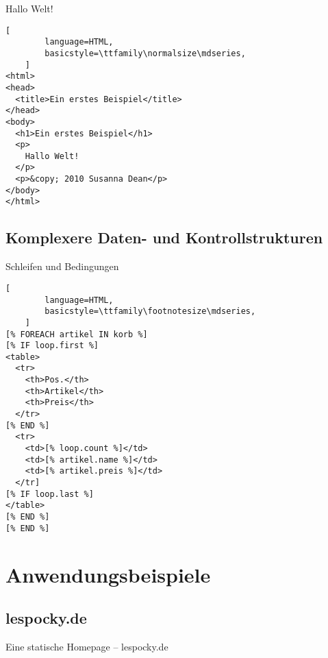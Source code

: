 \documentclass{beamer}
\begin{document}
\begin{frame}[fragile]{Hallo Welt!}
    \begin{lstlisting}[
        language=HTML,
        basicstyle=\ttfamily\normalsize\mdseries,
    ]
<html>
<head>
  <title>Ein erstes Beispiel</title>
</head>
<body>
  <h1>Ein erstes Beispiel</h1>
  <p>
    Hallo Welt!
  </p>
  <p>&copy; 2010 Susanna Dean</p>
</body>
</html>
    \end{lstlisting}
\end{frame}

\subsection{Komplexere Daten- und Kontrollstrukturen}

\begin{frame}[fragile]{Schleifen und Bedingungen}
    \begin{lstlisting}[
        language=HTML,
        basicstyle=\ttfamily\footnotesize\mdseries,
    ]
[% FOREACH artikel IN korb %]
[% IF loop.first %]
<table>
  <tr>
    <th>Pos.</th>
    <th>Artikel</th>
    <th>Preis</th>
  </tr>
[% END %]
  <tr>
    <td>[% loop.count %]</td>
    <td>[% artikel.name %]</td>
    <td>[% artikel.preis %]</td>
  </tr]
[% IF loop.last %]
</table>
[% END %]
[% END %]
    \end{lstlisting}
\end{frame}

\section{Anwendungsbeispiele}

\subsection{lespocky.de}

\begin{frame}{Eine statische Homepage -- lespocky.de}
\end{frame}
\end{document}
